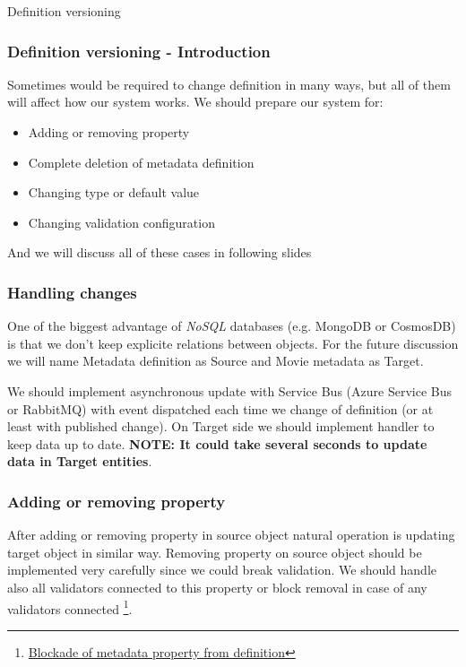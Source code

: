 \documentclass{beamer}
\begin{document}
\begin{section}{Definition versioning}

\begin{frame}
\frametitle{Definition versioning - Introduction}
Sometimes would be required to change definition in many ways, but all of them will affect how our system works. We should prepare our system for: 
\begin{itemize}
	\item Adding or removing property 
	\item Complete deletion of metadata definition
	\item Changing type or default value
	\item Changing validation configuration
\end{itemize}
And we will discuss all of these cases in following slides
\end{frame}

\begin{frame}
\frametitle{Handling changes}
One of the biggest advantage of \textit{NoSQL} databases (e.g. MongoDB or CosmosDB) is that we don't keep explicite relations between objects. For the future discussion we will name Metadata definition as Source and Movie metadata as Target. \newline \newline

We should implement asynchronous update with Service Bus (Azure Service Bus or RabbitMQ) with event dispatched each time we change of definition (or at least with published change). On Target side we should implement handler to keep data up to date.  \newline\textbf{NOTE: It could take several seconds to update data in Target entities}.

\end{frame}

\begin{frame}
\frametitle{Adding or removing property}
After adding or removing property in source object natural operation is updating target object in similar way.
\newline
\newline
Removing property on source object should be implemented very carefully since we could break validation. We should handle also all validators connected to this property or block removal in case of any validators connected \footnote[1]{\href{https://github.com/paqaos/DynamicMetadata-SFI2021/blob/main/MovieDatabase/MovieDatabase/CommandStack/CommandHandlers/MetadataDefinitions/RemoveMovieMetadataCommandHandler.cs}{Blockade of metadata property from definition}}.
\end{frame}


\end{section}
\end{document}
